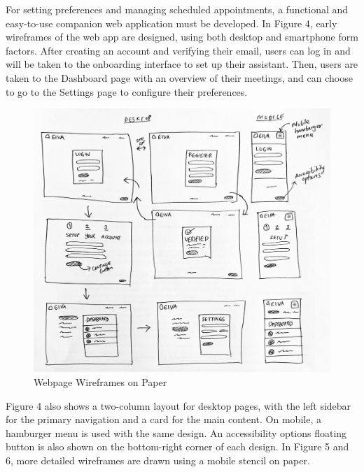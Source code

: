 \documentclass{article}
\begin{document}
For setting preferences and managing scheduled appointments, a functional and easy-to-use companion web application must be developed. In Figure 4, early wireframes of the web app are designed, using both desktop and smartphone form factors. After creating an account and verifying their email, users can log in and will be taken to the onboarding interface to set up their assistant. Then, users are taken to the Dashboard page with an overview of their meetings, and can choose to go to the Settings page to configure their preferences.

\begin{figure}[h]
	\includegraphics[width=\textwidth]{drawing-ui.jpg}
	\caption{Webpage Wireframes on Paper}
\end{figure}

Figure 4 also shows a two-column layout for desktop pages, with the left sidebar for the primary navigation and a card for the main content. On mobile, a hamburger menu is used with the same design. An accessibility options floating button is also shown on the bottom-right corner of each design. In Figure 5 and 6, more detailed wireframes are drawn using a mobile stencil on paper.
 
\end{document}
